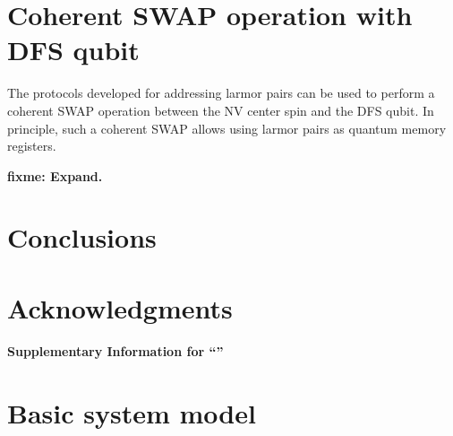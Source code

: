 \documentclass[twocolumn]{revtex4-1}
\newcommand{\fixme}[1]{{\bf \color{red} fixme: #1}}
\begin{document}
\section{Coherent SWAP operation with DFS qubit}

The protocols developed for addressing larmor pairs can be used to
perform a coherent SWAP operation between the NV center spin and the
DFS qubit. In principle, such a coherent SWAP allows using larmor
pairs as quantum memory registers.

\fixme{Expand.}


\section{Conclusions}


\section{Acknowledgments}




\pagebreak
\clearpage
\widetext \makeatletter
\begin{center}
  \large \bf Supplementary Information for ``\@title''
\end{center}
\setcounter{equation}{0}
\setcounter{figure}{0}
\setcounter{table}{0}
\renewcommand{\theequation}{S\arabic{equation}}
\renewcommand{\thefigure}{S\arabic{figure}}
\renewcommand{\bibnumfmt}[1]{[S#1]}
\renewcommand{\citenumfont}[1]{S#1}

\setcounter{section}{0}
\renewcommand{\thesection}{S.I. \Roman{section}}

\tableofcontents{}

\section{Basic system model}
\end{document}
